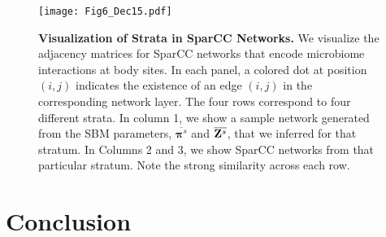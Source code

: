 \begin{figure}
\begin{center}
\texttt{[image: Fig6\_Dec15.pdf]}
\caption{{\bf Visualization of Strata in SparCC Networks.} We visualize the adjacency matrices for SparCC networks that encode microbiome interactions at body sites. In each panel, a colored dot at position $(i,j)$ indicates the existence of an edge $(i,j)$ in the corresponding network layer. The four rows correspond to four different strata. In column 1, we show a sample network generated from the SBM parameters, $\overline{{\boldsymbol \pi}^{s}}$ and $\overline{{\bf Z}^{s}}$, that we inferred for that stratum. In Columns 2 and 3, we show SparCC networks from that particular stratum. Note the strong similarity across each row.}
\label{sampleNet}
\end{center}
\end{figure}

\section{Conclusion}

